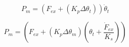 \begin{equation}
\label{eq:PEA_power}
	P_{m} = (F_{ex} + (K_{p} \Delta \theta_{t})) \dot{\theta}_{t}
\end{equation}

\begin{equation}
\label{eq:SEA_PEA_power}
	P_{m} = \left(F_{ex} + (K_{p} \Delta \theta_{m}) \left(\theta_{t} + \frac{\dot{F}_{ex}}{K_{s}}\right)\right)
\end{equation}


